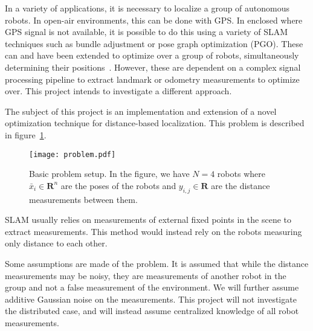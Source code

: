 In a variety of applications, it is necessary to localize a group of autonomous robots. In open-air environments, this can be done with GPS. In enclosed where GPS signal is not available, it is possible to do this using a variety of SLAM techniques such as bundle adjustment or pose graph optimization (PGO). These can and have been extended to optimize over a group of robots, simultaneously determining their positions~\cite{SLAM_distributed}. However, these are dependent on a complex signal processing pipeline to extract landmark or odometry measurements to optimize over. This project intends to investigate a different approach. 

The subject of this project is an implementation and extension of a novel optimization technique for distance-based localization. This problem is described in figure~\ref{fig:problem_desc}.
\begin{figure}[ht]
    \centering
    \texttt{[image: problem.pdf]}
    \caption{Basic problem setup. In the figure, we have $N=4$ robots where $\bar{x}_i\in \mathbf{R}^n$ are the poses of the robots and $y_{i,j} \in \mathbf{R}$ are the distance measurements between them. }
    \label{fig:problem_desc}
\end{figure}
SLAM usually relies on measurements of external fixed points in the scene to extract measurements. This method would instead rely on the robots measuring only distance to each other. 

Some assumptions are made of the problem. It is assumed that while the distance measurements may be noisy, they are measurements of another robot in the group and not a false measurement of the environment. We will further assume additive Gaussian noise on the measurements. This project will not investigate the distributed case, and will instead assume centralized knowledge of all robot measurements. 